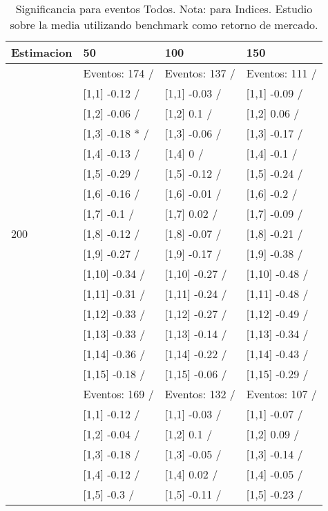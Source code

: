 \begin{table}

\caption{Significancia para eventos Todos. Nota: para Indices. Estudio sobre la media utilizando benchmark como retorno de mercado.}
\centering
\begin{tabular}[t]{llll}
\toprule
Estimacion & 50 & 100 & 150\\
\midrule
 & Eventos:  174 / & Eventos:  137 / & Eventos:  111 /\\
 & {}[1,1] -0.12  / & {}[1,1] -0.03  / & {}[1,1] -0.09  /\\
 & {}[1,2] -0.06  / & {}[1,2] 0.1  / & {}[1,2] 0.06  /\\
 & {}[1,3] -0.18 * / & {}[1,3] -0.06  / & {}[1,3] -0.17  /\\
 & {}[1,4] -0.13  / & {}[1,4] 0  / & {}[1,4] -0.1  /\\
\addlinespace
 & {}[1,5] -0.29  / & {}[1,5] -0.12  / & {}[1,5] -0.24  /\\
 & {}[1,6] -0.16  / & {}[1,6] -0.01  / & {}[1,6] -0.2  /\\
 & {}[1,7] -0.1  / & {}[1,7] 0.02  / & {}[1,7] -0.09  /\\
200 & {}[1,8] -0.12  / & {}[1,8] -0.07  / & {}[1,8] -0.21  /\\
 & {}[1,9] -0.27  / & {}[1,9] -0.17  / & {}[1,9] -0.38  /\\
\addlinespace
 & {}[1,10] -0.34  / & {}[1,10] -0.27  / & {}[1,10] -0.48  /\\
 & {}[1,11] -0.31  / & {}[1,11] -0.24  / & {}[1,11] -0.48  /\\
 & {}[1,12] -0.33  / & {}[1,12] -0.27  / & {}[1,12] -0.49  /\\
 & {}[1,13] -0.33  / & {}[1,13] -0.14  / & {}[1,13] -0.34  /\\
 & {}[1,14] -0.36  / & {}[1,14] -0.22  / & {}[1,14] -0.43  /\\
\addlinespace
 & {}[1,15] -0.18  / & {}[1,15] -0.06  / & {}[1,15] -0.29  /\\
 & Eventos:  169 / & Eventos:  132 / & Eventos:  107 /\\
 & {}[1,1] -0.12  / & {}[1,1] -0.03  / & {}[1,1] -0.07  /\\
 & {}[1,2] -0.04  / & {}[1,2] 0.1  / & {}[1,2] 0.09  /\\
 & {}[1,3] -0.18  / & {}[1,3] -0.05  / & {}[1,3] -0.14  /\\
\addlinespace
 & {}[1,4] -0.12  / & {}[1,4] 0.02  / & {}[1,4] -0.05  /\\
 & {}[1,5] -0.3  / & {}[1,5] -0.11  / & {}[1,5] -0.23  /\\

\end{tabular}
\end{table}
